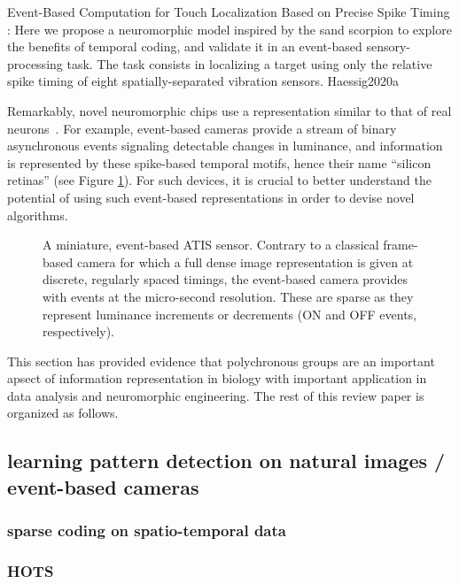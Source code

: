\documentclass[brainsci, %
               review,submit,pdftex,moreauthors%
               ]{Definitions/mdpi}
\begin{document}
Event-Based Computation for Touch Localization Based on Precise Spike Timing : Here we propose a neuromorphic model inspired by the sand scorpion to explore the benefits of temporal coding, and validate it in an event-based sensory-processing task. The task consists in localizing a target using only the relative spike timing of eight spatially-separated vibration sensors.  Haessig2020a

Remarkably, novel neuromorphic chips use a representation similar to that of real neurons~\citep{rasetto_challenges_2022}. For example, event-based cameras provide a stream of binary asynchronous events signaling detectable changes in luminance, and information is represented by these spike-based temporal motifs, hence their name ``silicon retinas'' (see Figure \ref{fig:silicon_retina}). For such devices, it is crucial to better understand the potential of using such event-based representations in order to devise novel algorithms.

\begin{figure}
\centering
\caption{A miniature, event-based ATIS sensor. Contrary to a classical frame-based camera for which a full dense image representation is given at discrete, regularly spaced timings, the event-based camera provides with events at the micro-second resolution. These are sparse as they represent luminance increments or decrements (ON and OFF events, respectively).}\label{fig:silicon_retina}
\end{figure}
This section has provided evidence that polychronous groups are an important apsect of information representation in biology with important application in data analysis and neuromorphic engineering. The rest of this review paper is organized as follows.



\subsection{learning pattern detection on natural images / event-based cameras}\label{learning-pattern-detection-on-natural-images-event-based-cameras}
\subsubsection{sparse coding on spatio-temporal data}\label{sparse-coding-on-spatio-temporal-data}
\subsubsection{HOTS}\label{hots}
\end{document}
